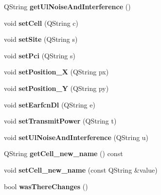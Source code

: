 \begin{DoxyCompactItemize}
\item 
Q\+String {\bfseries get\+Ul\+Noise\+And\+Interference} ()\hypertarget{class_cell_a0e3e0ec7480754de2a31590f9c9dc079}{}\label{class_cell_a0e3e0ec7480754de2a31590f9c9dc079}

\item 
void {\bfseries set\+Cell} (Q\+String c)\hypertarget{class_cell_a0a780eaf3218cbee2ded585634a2a0a1}{}\label{class_cell_a0a780eaf3218cbee2ded585634a2a0a1}

\item 
void {\bfseries set\+Site} (Q\+String s)\hypertarget{class_cell_af1fe8b468da9c30f7a134daf9d510212}{}\label{class_cell_af1fe8b468da9c30f7a134daf9d510212}

\item 
void {\bfseries set\+Pci} (Q\+String s)\hypertarget{class_cell_ab72dd0a9fbe24e254e25ea66e4a34c5a}{}\label{class_cell_ab72dd0a9fbe24e254e25ea66e4a34c5a}

\item 
void {\bfseries set\+Position\+\_\+X} (Q\+String px)\hypertarget{class_cell_a9445a38c257ec3e2dc25bff38d9d5948}{}\label{class_cell_a9445a38c257ec3e2dc25bff38d9d5948}

\item 
void {\bfseries set\+Position\+\_\+Y} (Q\+String py)\hypertarget{class_cell_ab688ae364074e0a91744d0e4db64f0a9}{}\label{class_cell_ab688ae364074e0a91744d0e4db64f0a9}

\item 
void {\bfseries set\+Earfcn\+Dl} (Q\+String e)\hypertarget{class_cell_a3e4aca1298f1f45067be89a7e4710a14}{}\label{class_cell_a3e4aca1298f1f45067be89a7e4710a14}

\item 
void {\bfseries set\+Transmit\+Power} (Q\+String t)\hypertarget{class_cell_a12298307ef647d4b4cacfe2efed5214d}{}\label{class_cell_a12298307ef647d4b4cacfe2efed5214d}

\item 
void {\bfseries set\+Ul\+Noise\+And\+Interference} (Q\+String u)\hypertarget{class_cell_a899fe6e29a3160988547ae2bfaf3adfe}{}\label{class_cell_a899fe6e29a3160988547ae2bfaf3adfe}

\item 
Q\+String {\bfseries get\+Cell\+\_\+new\+\_\+name} () const \hypertarget{class_cell_a81b2f4bc74ea50a7c693839f4f024ea4}{}\label{class_cell_a81b2f4bc74ea50a7c693839f4f024ea4}

\item 
void {\bfseries set\+Cell\+\_\+new\+\_\+name} (const Q\+String \&value)\hypertarget{class_cell_af7043367512ea12553c2ed31b1cafe73}{}\label{class_cell_af7043367512ea12553c2ed31b1cafe73}

\item 
bool {\bfseries was\+There\+Changes} ()\hypertarget{class_cell_a75de9576e08b33760b550ce4fed6dd75}{}\label{class_cell_a75de9576e08b33760b550ce4fed6dd75}

\end{DoxyCompactItemize}
